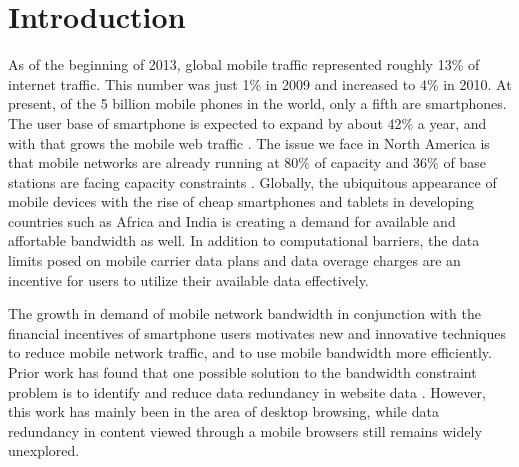 \section{Introduction}
As of the beginning of 2013, global mobile traffic represented roughly 13\% of internet traffic. This number was just 1\% in 2009 and increased to 4\% in 2010. At present, of the 5 billion mobile phones in the world, only a fifth are smartphones. The user base of smartphone is expected to expand by about 42\% a year, and with that grows the mobile web traffic \cite{olson}. The issue we face in North America is that mobile networks are already running at 80\% of capacity and 36\% of base stations are facing capacity constraints \cite{baldwin}. Globally, the ubiquitous appearance of mobile devices with the rise of cheap smartphones and tablets in developing countries such as Africa and India is creating a demand for available and affortable bandwidth as well. In addition to computational barriers, the data limits posed on mobile carrier data plans and data overage charges are an incentive for users to utilize their available data effectively. 

The growth in demand of mobile network bandwidth in conjunction with the financial incentives of smartphone users motivates new and innovative techniques to reduce mobile network traffic, and to use mobile bandwidth more efficiently. Prior work has found that one possible solution to the bandwidth constraint problem is to identify and reduce data redundancy in website data \cite{spring, }. However, this work has mainly been in the area of desktop browsing, while data redundancy in content viewed through a mobile browsers still remains widely unexplored.  

